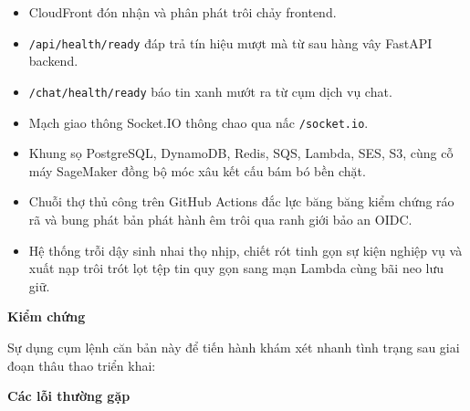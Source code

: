 \begin{itemize}
\tightlist
\item
  CloudFront đón nhận và phân phát trôi chảy frontend.
\item
  \texttt{/\allowbreak{}api/\allowbreak{}health/\allowbreak{}ready} đáp trả tín hiệu mượt mà từ sau hàng vây
  FastAPI backend.
\item
  \texttt{/\allowbreak{}chat/\allowbreak{}health/\allowbreak{}ready} báo tin xanh mướt ra từ cụm dịch vụ chat.
\item
  Mạch giao thông Socket.IO thông chao qua nấc \texttt{/\allowbreak{}socket.\allowbreak{}io}.
\item
  Khung sọ PostgreSQL, DynamoDB, Redis, SQS, Lambda, SES, S3, cùng cỗ
  máy SageMaker đồng bộ móc xâu kết cấu bám bó bền chặt.
\item
  Chuỗi thợ thủ công trên GitHub Actions đắc lực băng băng kiểm chứng
  ráo rã và bung phát bản phát hành êm trôi qua ranh giới bảo an OIDC.
\item
  Hệ thống trỗi dậy sinh nhai thọ nhịp, chiết rót tinh gọn sự kiện
  nghiệp vụ và xuất nạp trôi trót lọt tệp tin quy gọn sang mạn Lambda
  cùng bãi neo lưu giữ.
\end{itemize}

\vspace{0.5em}\noindent\textbf{Kiểm chứng}\par

Sự dụng cụm lệnh căn bản này để tiến hành khám xét nhanh tình trạng sau
giai đoạn thâu thao triển khai:

\begin{Shaded}
\begin{Highlighting}[]
 
 
 
\end{Highlighting}
\end{Shaded}

\vspace{0.5em}\noindent\textbf{Các lỗi thường
gặp}\par

